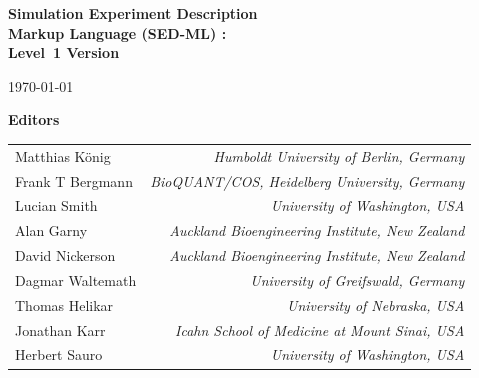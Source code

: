
\begin{titlepage}


\begin{center}

  \textbf{\sffamily\bfseries\huge
    Simulation Experiment Description\\ Markup Language (SED-ML) :\\[0.3em]
    Level~1 Version~}

\vspace*{0.5in}

\large
\today\\[0.25in]


\vspace{0.5in}

\textbf{\sffamily Editors}\\[7pt]
\begin{tabular}{l>{\hspace*{15pt}}r}
Matthias K\"{o}nig & \emph{Humboldt University of Berlin, Germany}\\
Frank T Bergmann & \emph{BioQUANT/COS, Heidelberg University, Germany}\\
Lucian Smith & \emph{University of Washington, USA}\\
Alan Garny & \emph{Auckland Bioengineering Institute, New Zealand}\\
David Nickerson & \emph{Auckland Bioengineering Institute, New Zealand}\\
Dagmar Waltemath & \emph{University of Greifswald, Germany}\\
Thomas Helikar & \emph{University of Nebraska, USA}\\
Jonathan Karr & \emph{Icahn School of Medicine at Mount Sinai, USA}\\
Herbert Sauro & \emph{University of Washington, USA}
\end{tabular}
 

\end{center}
\end{titlepage}
